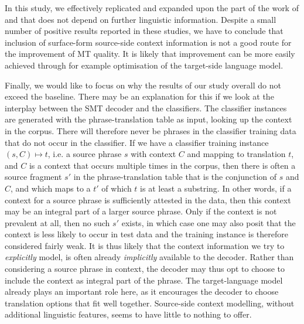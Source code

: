 
In this study, we effectively replicated and expanded upon the part of the work
of \cite{Stroppa+07} and \cite{Rejwanul+11} that does not depend on further
linguistic information. Despite a small number of positive results reported in these
studies, we have to conclude that inclusion of surface-form source-side context
information is not a good route for the improvement of MT quality. It is likely
that improvement can be more easily achieved through for example optimisation
of the target-side language model.

Finally, we would like to focus on why the results of our study
overall do not exceed the baseline.  There may be an explanation for this
if we look at the interplay between the SMT decoder and the classifiers. The
classifier instances are generated with the phrase-translation table as input,
looking up the context in the corpus. There will therefore never be phrases in
the classifier training data that do not occur in the classifier. If we have a
classifier training instance $(s,C) \mapsto t$, i.e.  a source phrase $s$ with
context $C$ and mapping to translation $t$, and $C$ is a context that occurs
multiple times in the corpus, then there is often a source fragment $s'$ in the
phrase-translation table that is the conjunction of $s$ and $C$, and which maps
to a $t'$ of which $t$ is at least a substring. In other words, if a context
for a source phrase is sufficiently attested in the data, then this context may be
an integral part of a larger source phrase. Only if the context is not
prevalent at all, then no such $s'$ exists, in which case one may also posit
that the context is less likely to occur in test data and the training instance
is therefore considered fairly weak.  It is thus likely that the context
information we try to \emph{explicitly} model, is often already
\emph{implicitly} available to the decoder.  Rather than considering a source
phrase in context, the decoder may thus opt to choose to include the context as
integral part of the phrase.  The target-language model already plays an
important role here, as it encourages the decoder to choose translation options
that fit well together. Source-side context modelling, without additional
linguistic features, seems to have little to nothing to offer.

